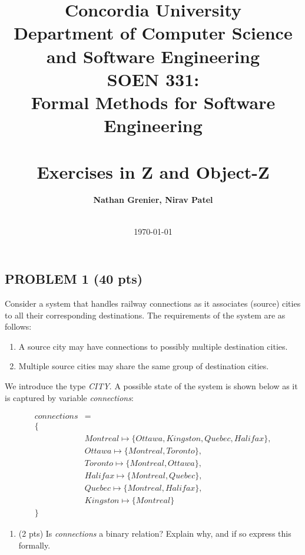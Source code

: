 \documentclass[12pt]{article}
\title{Concordia University\\
Department of Computer Science and Software Engineering\\
\textbf{SOEN 331:\\Formal Methods for Software Engineering}\\
\ \\
\textbf{Exercises in Z and Object-Z}}
\author{\textbf{Nathan Grenier, Nirav Patel}\\
\ \\}
\date{\today}
\begin{document}
\begin{spacing}{1.5}
	
	\maketitle
	
	\newpage
	
	\section*{PROBLEM 1 (40 pts)}
	
	Consider a system that handles railway connections as it associates (source) cities to all their corresponding destinations. The requirements of the system are as follows:
	
	\begin{enumerate}
		\item A source city may have connections to possibly multiple destination cities.
		\item Multiple source cities may share the same group of destination cities.
	\end{enumerate}
	
	We introduce the type \textit{CITY}. A possible state of the system is shown below as it is captured by variable \textit{connections}:
	
	\begin{align*}
		connections & =                                                       \\
		\{ \\
		            & Montreal \mapsto \{Ottawa, Kingston, Quebec, Halifax\}, \\
		            & Ottawa \mapsto \{Montreal, Toronto\},                   \\
		            & Toronto \mapsto \{Montreal, Ottawa\},                   \\
		            & Halifax \mapsto \{Montreal, Quebec\},                   \\
		            & Quebec \mapsto \{Montreal, Halifax\},                   \\
		            & Kingston \mapsto \{Montreal\}                           \\
		\}
	\end{align*}
	
	\begin{enumerate}
		\item (2 pts) Is \textit{connections} a binary relation? Explain why, and if so express this formally.
        \newline
        

\end{enumerate}
\end{spacing}
\end{document}
